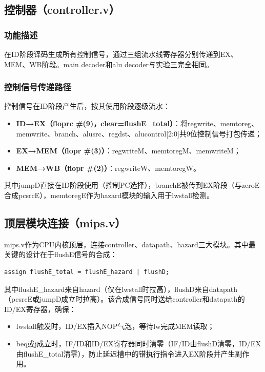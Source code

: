 \subsection{控制器（controller.v）}

\subsubsection{功能描述}

在ID阶段译码生成所有控制信号，通过三组流水线寄存器分别传递到EX、MEM、WB阶段。main decoder和alu decoder与实验三完全相同。

\subsubsection{控制信号传递路径}

控制信号在ID阶段产生后，按其使用阶段逐级流水：

\begin{itemize}
    \item \textbf{ID→EX（floprc \#(9)，clear=flushE\_total）}：将regwrite、memtoreg、memwrite、branch、alusrc、regdst、alucontrol[2:0]共9位控制信号打包传递；
    \item \textbf{EX→MEM（flopr \#(3)）}：regwriteM、memtoregM、memwriteM；
    \item \textbf{MEM→WB（flopr \#(2)）}：regwriteW、memtoregW。
\end{itemize}

其中jumpD直接在ID阶段使用（控制PC选择），branchE被传到EX阶段（与zeroE合成pcsrcE），memtoregE作为hazard模块的输入用于lwstall检测。

\subsection{顶层模块连接（mips.v）}

mips.v作为CPU内核顶层，连接controller、datapath、hazard三大模块。其中最关键的设计在于flushE信号的合成：

\begin{verbatim}
assign flushE_total = flushE_hazard | flushD;
\end{verbatim}

其中flushE\_hazard来自hazard（仅在lwstall时拉高），flushD来自datapath（pcsrcE或jumpD成立时拉高）。该合成信号同时送给controller和datapath的ID/EX寄存器，确保：

\begin{itemize}
    \item lwstall触发时，ID/EX插入NOP气泡，等待lw完成MEM读取；
    \item beq或j成立时，IF/ID和ID/EX寄存器同时清零（IF/ID由flushD清零，ID/EX由flushE\_total清零），防止延迟槽中的错执行指令进入EX阶段并产生副作用。
\end{itemize}

